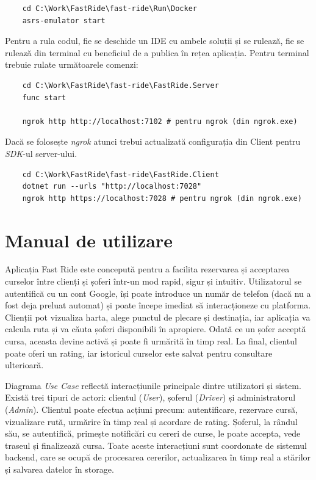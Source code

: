 \begin{verbatim}
    cd C:\Work\FastRide\fast-ride\Run\Docker
    asrs-emulator start
\end{verbatim}

Pentru a rula codul, fie se deschide un IDE cu ambele soluții și se rulează, fie se rulează din terminal
cu beneficiul de a publica în rețea aplicația. Pentru terminal trebuie rulate următoarele comenzi:

\begin{verbatim}
    cd C:\Work\FastRide\fast-ride\FastRide.Server
    func start

    ngrok http http://localhost:7102 # pentru ngrok (din ngrok.exe)
\end{verbatim}

Dacă se folosește \textit{ngrok} atunci trebui actualizată configurația din Client pentru \textit{SDK}-ul server-ului.
\begin{verbatim}
    cd C:\Work\FastRide\fast-ride\FastRide.Client
    dotnet run --urls "http://localhost:7028"
    ngrok http https://localhost:7028 # pentru ngrok (din ngrok.exe)
\end{verbatim}


\section{Manual de utilizare}

Aplicația Fast Ride este concepută pentru a facilita rezervarea și acceptarea curselor între
clienți și șoferi într-un mod rapid, sigur și intuitiv. Utilizatorul se autentifică
cu un cont Google, își poate introduce un număr de telefon (dacă nu a fost deja 
preluat automat) și poate începe imediat să interacționeze cu platforma.
Clienții pot vizualiza harta, alege punctul de plecare și destinația, iar aplicația
va calcula ruta și va căuta șoferi disponibili în apropiere. Odată ce un șofer 
acceptă cursa, aceasta devine activă și poate fi urmărită în timp real. La final, 
clientul poate oferi un rating, iar istoricul curselor este salvat pentru consultare 
ulterioară.

Diagrama \textit{Use Case} reflectă interacțiunile principale dintre utilizatori și sistem. 
Există trei tipuri de actori: clientul (\textit{User}), șoferul (\textit{Driver}) și administratorul (\textit{Admin}).
Clientul poate efectua acțiuni precum: 
autentificare, rezervare cursă, vizualizare rută, urmărire în timp real și acordare de rating. 
Șoferul, la rândul său, se autentifică, primește 
notificări cu cereri de curse, le poate accepta, vede traseul și finalizează cursa. 
Toate aceste interacțiuni sunt coordonate de sistemul backend, care se ocupă de procesarea 
cererilor, actualizarea în timp real a stărilor și salvarea datelor în storage.

